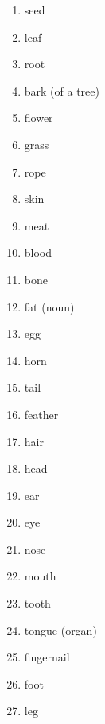 \begin{enumerate}
\item   seed 

\item   leaf 

\item   root 

\item   bark (of a tree) 

\item   flower 

\item   grass 

\item   rope 

\item   skin 

\item   meat 

\item   blood 

\item   bone 

\item   fat (noun) 

\item   egg 

\item   horn 

\item   tail 

\item   feather 

\item   hair 

\item   head 

\item   ear 

\item   eye 

\item   nose 

\item   mouth 

\item   tooth 

\item   tongue (organ) 

\item   fingernail 

\item   foot 

\item   leg 


\end{enumerate}

